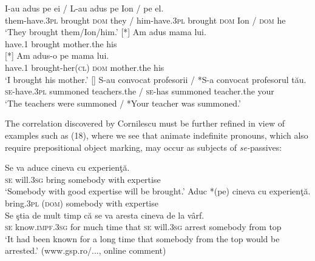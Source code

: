 \documentclass[output=paper]{langsci/langscibook}
\begin{document}
\begin{xlista}[c{'}{'}.]
{    \gll I-au                 adus      pe    ei    /   L-au               adus      pe    Ion /   pe    el.\\
         them-have.\textsc{3pl} brought \textsc{dom} they /  him-have.\textsc{3pl} brought \textsc{dom} Ion /  \textsc{dom} he\\
    \glt ‘They brought them/Ion/him.’}
    [*]{
    \gll Am      adus     mama         lui. \\
         have.\textsc{1} brought mother.the his\\
    }
    [*]{
     \gll Am      adus-o               pe    mama         lui. \\
           have.\textsc{1} brought-her(\textsc{cl}) \textsc{dom} mother.the his \\
     \glt       ‘I brought his mother.’
    }
    []{
    \gll S-au            convocat   profesorii     / *S-a convocat        profesorul   tău. \\
         \textsc{se-}have.\textsc{3pl} summoned teachers.the / \textsc{se-}has summoned teacher.the your \\
    \glt ‘The teachers were summoned / *Your teacher was summoned.’}
    \end{xlista}
\z

The correlation discovered by Cornilescu must be further refined in view of examples such as (18), where we see that animate indefinite pronouns, which also require prepositional object marking, may occur as subjects of \textit{se-}passives:

\ea%
    \label{ex:giurgea:18}
    \ea
    \gll  Se va           aduce  cineva       cu    experienţă.\\
         \textsc{se} will.\textsc{3sg}  bring   somebody with expertise\\
    \glt ‘Somebody with good expertise will be brought.’
    \ex
    \gll Aduc      *(pe)   cineva        cu    experienţă.\\
         bring.\textsc{3pl} (\textsc{dom}) somebody with expertise\\
    \ex
    \gll Se ştia                  de  mult  timp  că   se  va          aresta cineva       {de la} vârf.\\
         \textsc{se} know.\textsc{impf.3sg} for much time that \textsc{se} will.\textsc{3sg} arrest somebody from top\\
    \glt ‘It had been known for a long time that somebody from the top would be arrested.’ (www.gsp.ro/..., online comment)
    \z
\z    
\end{document}
